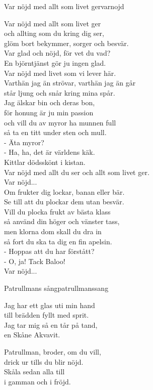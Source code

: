 \begin{song}{Var nöjd med allt som livet ger}{varnojd}
\begin{vers}
Var nöjd med allt som livet ger \\
och allting som du kring dig ser,\\
glöm bort bekymmer, sorger och besvär. \\
Var glad och nöjd, för vet du vad? \\
En björntjänst gör ju ingen glad.\\
Var nöjd med livet som vi lever här. \\
Varthän jag än strövar, varthän jag än går \\
står ljung och snår kring mina spår. \\
Jag älskar bin och deras bon, \\
för honung är ju min passion\\
och vill du av myror ha munnen full \\
så ta en titt under sten och mull.\\
- Äta myror?\\
- Ha, ha, det är världens käk.\\
Kittlar dödsskönt i kistan. \\
Var nöjd med allt du ser och allt som livet ger.\\
Var nöjd...\\
Om frukter dig lockar, banan eller bär.\\
Se till att du plockar dem utan besvär. \\
Vill du plocka frukt av bästa klass \\
så använd din höger och vänster tass, \\
men klorna dom skall du dra in\\
så fort du ska ta dig en fin apelsin.\\
- Hoppas att du har förstått?\\
- O, ja! Tack Baloo!\\
Var nöjd...\\
\end{vers}
\end{song}


\begin{song}{Patrullmans sång}{patrullmanssang}
\begin{vers}
Jag har ett glas uti min hand\\
till brädden fyllt med sprit.\\
Jag tar mig så en tår på tand,\\
en Skåne Akvavit.\\
\end{vers}
\begin{vers}
Patrullman, broder, om du vill,\\
drick ur tills du blir nöjd.\\
Skåla sedan alla till\\
i gamman och i fröjd.\\
\end{vers}
\end{song}

